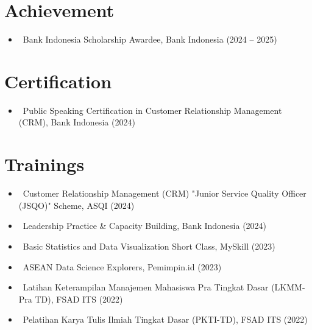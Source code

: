 \documentclass[letterpaper,10pt]{article}
\newcommand{\resumeItem}[1]{\item\small{#1}}
\newcommand{\resumeSubHeadingList}{\begin{itemize}[leftmargin=0.15in, label={}]}
\newcommand{\resumeSubHeadingListEnd}{\end{itemize}}
\begin{document}
\section{Achievement}
\resumeSubHeadingList
  \resumeItem{\textbullet\ Bank Indonesia Scholarship Awardee, Bank Indonesia (2024 -- 2025)}
\resumeSubHeadingListEnd

\section{Certification}
\resumeSubHeadingList
  \resumeItem{\textbullet\ Public Speaking Certification in Customer Relationship Management (CRM), Bank Indonesia (2024)}
\resumeSubHeadingListEnd

\section{Trainings}
\resumeSubHeadingList
  \resumeItem{\textbullet\ Customer Relationship Management (CRM) "Junior Service Quality Officer (JSQO)" Scheme, ASQI (2024)}
  \resumeItem{\textbullet\ Leadership Practice \& Capacity Building, Bank Indonesia (2024)}
  \resumeItem{\textbullet\ Basic Statistics and Data Visualization Short Class, MySkill (2023)}
  \resumeItem{\textbullet\ ASEAN Data Science Explorers, Pemimpin.id (2023)}
  \resumeItem{\textbullet\ Latihan Keterampilan Manajemen Mahasiswa Pra Tingkat Dasar (LKMM-Pra TD), FSAD ITS (2022)}
  \resumeItem{\textbullet\ Pelatihan Karya Tulis Ilmiah Tingkat Dasar (PKTI-TD), FSAD ITS (2022)}
\resumeSubHeadingListEnd
\end{document}

